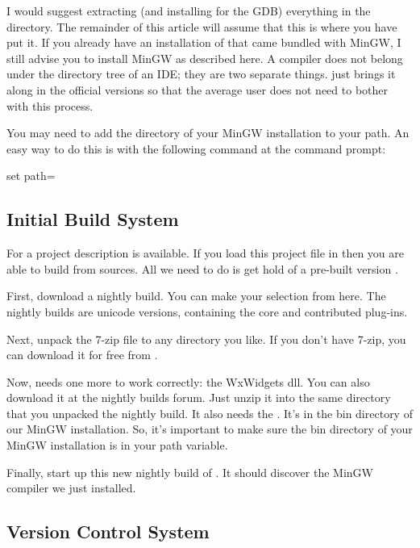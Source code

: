 I would suggest extracting (and installing for the GDB) everything in the  directory. The remainder of this article will assume that this is where you have put it. If you already have an installation of \codeblocks that came bundled with MinGW, I still advise you to install MinGW as described here. A compiler does not belong under the directory tree of an IDE; they are two separate things. \codeblocks just brings it along in the official versions so that the average user does not need to bother with this process.

You may need to add the  directory of your MinGW installation to your path. An easy way to do this is with the following command at the command prompt:

\begin{cmd}
set path=%
\end{cmd}

\subsection{Initial Build System}

For \cite{url:cb} a project description  is available. If you load this project file in \codeblocks then you are able to build \codeblocks from sources. All we need to do is get hold of a pre-built version \codeblocks.

First, download a nightly build. You can make your selection from here. The nightly builds are unicode versions, containing the core and contributed plug-ins.

Next, unpack the 7-zip file to any directory you like. If you don't have 7-zip, you can download it for free from \cite{url:zip}.

Now, \codeblocks needs one more  to work correctly: the WxWidgets dll. You can also download it at the nightly builds forum. Just unzip it into the same directory that you unpacked the \codeblocks nightly build. It also needs the . It's in the bin directory of our MinGW installation. So, it's important to make sure the bin directory of your MinGW installation is in your path variable.

Finally, start up this new nightly build of \codeblocks. It should discover the MinGW compiler we just installed.

\subsection{Version Control System}

